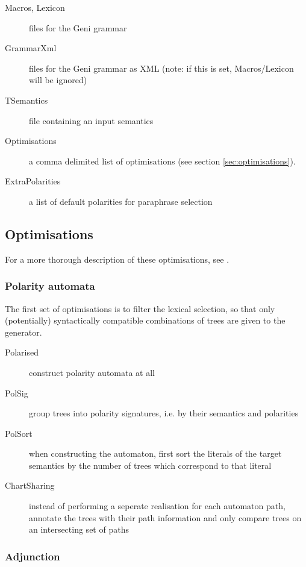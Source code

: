 \documentclass[11pt]{article}
\begin{document}
\begin{description}
\item[Macros, Lexicon] files for the Geni grammar
\item[GrammarXml]      files for the Geni grammar as XML (note: if this
                       is set, Macros/Lexicon will be ignored)
\item[TSemantics]      file containing an input semantics
\item[Optimisations]   a comma delimited list of optimisations (see
                       section \ref{sec:optimisations}).
\item[ExtraPolarities] a list of default polarities for paraphrase selection   
\end{description}

\subsection{Optimisations}

For a more thorough description of these optimisations, see
\cite{kow2003}.

\subsubsection{Polarity automata}

The first set of optimisations is to filter the lexical selection,
so that only (potentially) syntactically compatible combinations
of trees are given to the generator.  

\begin{description}
\item[Polarised] construct polarity automata at all
\item[PolSig]    group trees into polarity signatures, i.e. by their
                 semantics and polarities
\item[PolSort]   when constructing the automaton, first sort the
                 literals of the target semantics by the number
                 of trees which correspond to that literal
\item[ChartSharing] instead of performing a seperate realisation
                    for each automaton path, annotate the trees
                    with their path information and only compare
                    trees on an intersecting set of paths
\end{description}

\subsubsection{Adjunction}
\end{document}

